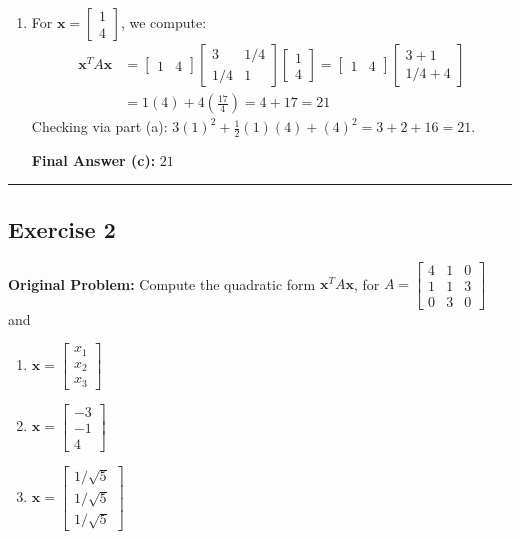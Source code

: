\documentclass[11pt, letterpaper]{article}
\theoremstyle{definition}
\theoremstyle{remark}
\begin{document}
\begin{enumerate}[label=\alph*.]
    \textbf{Final Answer (b):} $197$

    \item For $\mathbf{x} = \begin{bmatrix} 1 \\ 4 \end{bmatrix}$, we compute:
    \begin{align*}
        \mathbf{x}^T A \mathbf{x} &= \begin{bmatrix} 1 & 4 \end{bmatrix} \begin{bmatrix} 3 & 1/4 \\ 1/4 & 1 \end{bmatrix} \begin{bmatrix} 1 \\ 4 \end{bmatrix} = \begin{bmatrix} 1 & 4 \end{bmatrix} \begin{bmatrix} 3 + 1 \\ 1/4 + 4 \end{bmatrix} \\
        &= 1(4) + 4\left(\frac{17}{4}\right) = 4 + 17 = 21
    \end{align*}
    Checking via part (a): $3(1)^2 + \frac{1}{2}(1)(4) + (4)^2 = 3 + 2 + 16 = 21$.
    
    \textbf{Final Answer (c):} $21$
\end{enumerate}

\medskip\hrule\medskip

\subsection*{Exercise 2}
\textbf{Original Problem:} Compute the quadratic form $\mathbf{x}^T A \mathbf{x}$, for $A = \begin{bmatrix} 4 & 1 & 0 \\ 1 & 1 & 3 \\ 0 & 3 & 0 \end{bmatrix}$ and
\begin{enumerate}[label=\alph*.]
    \item $\mathbf{x} = \begin{bmatrix} x_1 \\ x_2 \\ x_3 \end{bmatrix}$
    \item $\mathbf{x} = \begin{bmatrix} -3 \\ -1 \\ 4 \end{bmatrix}$
    \item $\mathbf{x} = \begin{bmatrix} 1/\sqrt{5} \\ 1/\sqrt{5} \\ 1/\sqrt{5} \end{bmatrix}$
\end{enumerate}
\end{document}
